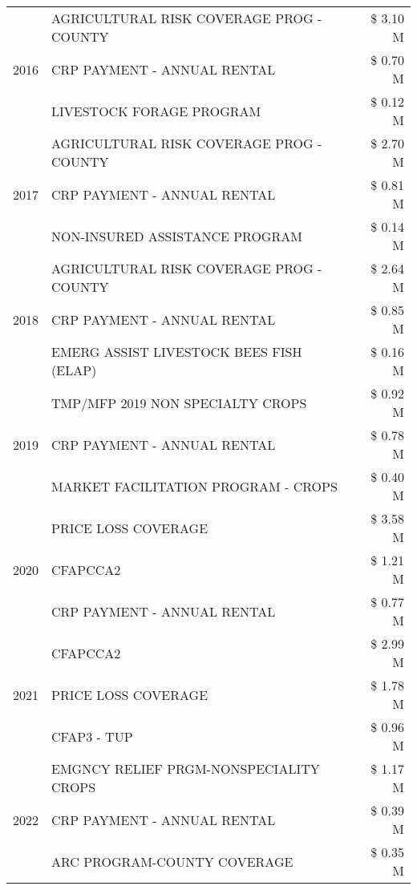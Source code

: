 \begin{tabular}{llr}
\cline{1-3}
\multirow[t]{3}{*}{2016} & AGRICULTURAL RISK COVERAGE PROG - COUNTY & \$ 3.10 M \\
 & CRP PAYMENT - ANNUAL RENTAL & \$ 0.70 M \\
 & LIVESTOCK FORAGE PROGRAM & \$ 0.12 M \\
\cline{1-3}
\multirow[t]{3}{*}{2017} & AGRICULTURAL RISK COVERAGE PROG - COUNTY & \$ 2.70 M \\
 & CRP PAYMENT - ANNUAL RENTAL & \$ 0.81 M \\
 & NON-INSURED ASSISTANCE PROGRAM & \$ 0.14 M \\
\cline{1-3}
\multirow[t]{3}{*}{2018} & AGRICULTURAL RISK COVERAGE PROG - COUNTY & \$ 2.64 M \\
 & CRP PAYMENT - ANNUAL RENTAL & \$ 0.85 M \\
 & EMERG ASSIST LIVESTOCK BEES FISH (ELAP) & \$ 0.16 M \\
\cline{1-3}
\multirow[t]{3}{*}{2019} & TMP/MFP 2019 NON SPECIALTY CROPS & \$ 0.92 M \\
 & CRP PAYMENT - ANNUAL RENTAL & \$ 0.78 M \\
 & MARKET FACILITATION PROGRAM - CROPS & \$ 0.40 M \\
\cline{1-3}
\multirow[t]{3}{*}{2020} & PRICE LOSS COVERAGE & \$ 3.58 M \\
 & CFAPCCA2 & \$ 1.21 M \\
 & CRP PAYMENT - ANNUAL RENTAL & \$ 0.77 M \\
\cline{1-3}
\multirow[t]{3}{*}{2021} & CFAPCCA2 & \$ 2.99 M \\
 & PRICE LOSS COVERAGE & \$ 1.78 M \\
 & CFAP3 - TUP & \$ 0.96 M \\
\cline{1-3}
\multirow[t]{3}{*}{2022} & EMGNCY RELIEF PRGM-NONSPECIALITY CROPS & \$ 1.17 M \\
 & CRP PAYMENT - ANNUAL RENTAL & \$ 0.39 M \\
 & ARC PROGRAM-COUNTY COVERAGE & \$ 0.35 M \\
\cline{1-3}
\bottomrule
\end{tabular}
